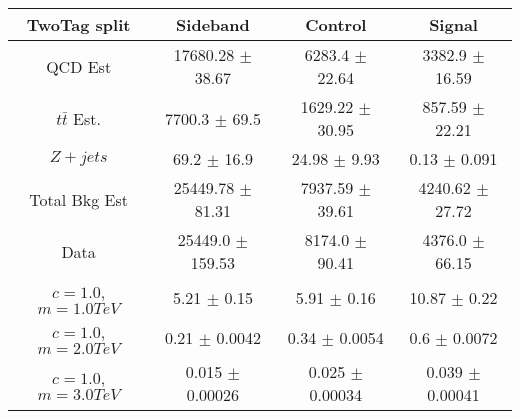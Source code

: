 \begin{footnotesize} 
\begin{tabular}{c|c|c|c} 
TwoTag split & Sideband & Control & Signal \\ 
\hline\hline 
QCD Est & 17680.28 $\pm$ 38.67 & 6283.4 $\pm$ 22.64 & 3382.9 $\pm$ 16.59\\ 
$t\bar{t}$ Est.  & 7700.3 $\pm$ 69.5 & 1629.22 $\pm$ 30.95 & 857.59 $\pm$ 22.21\\ 
$Z+jets$ & 69.2 $\pm$ 16.9 & 24.98 $\pm$ 9.93 & 0.13 $\pm$ 0.091\\ 
Total Bkg Est & 25449.78 $\pm$ 81.31 & 7937.59 $\pm$ 39.61 & 4240.62 $\pm$ 27.72\\ 
Data & 25449.0 $\pm$ 159.53 & 8174.0 $\pm$ 90.41 & 4376.0 $\pm$ 66.15\\ 
$c=1.0$,$m=1.0TeV$ & 5.21 $\pm$ 0.15 & 5.91 $\pm$ 0.16 & 10.87 $\pm$ 0.22\\ 
$c=1.0$,$m=2.0TeV$ & 0.21 $\pm$ 0.0042 & 0.34 $\pm$ 0.0054 & 0.6 $\pm$ 0.0072\\ 
$c=1.0$,$m=3.0TeV$ & 0.015 $\pm$ 0.00026 & 0.025 $\pm$ 0.00034 & 0.039 $\pm$ 0.00041\\ 
\hline\hline 
\end{tabular} 
\end{footnotesize} 
\newline 
